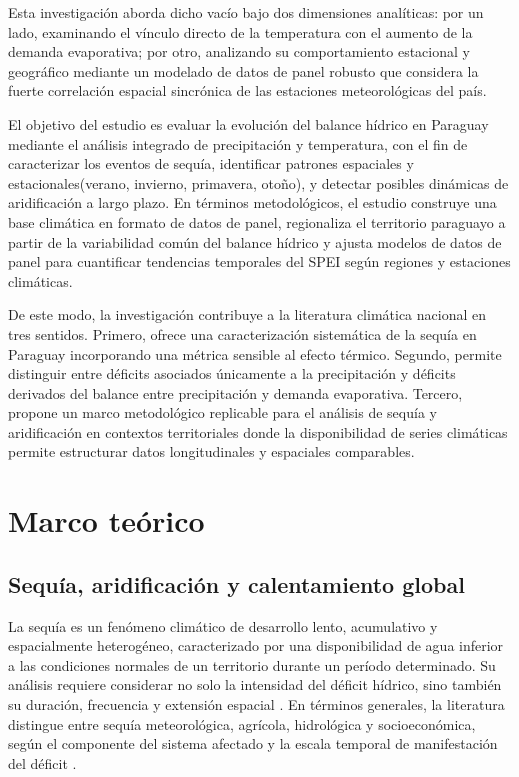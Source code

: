 \documentclass[11pt,a4paper]{article}
\begin{document}
Esta investigación aborda dicho vacío bajo dos dimensiones analíticas: por un lado, examinando el vínculo directo de la temperatura con el aumento de la demanda evaporativa; por otro, analizando su comportamiento estacional y geográfico mediante un modelado de datos de panel robusto que considera la fuerte correlación espacial sincrónica de las estaciones meteorológicas del país.

El objetivo del estudio es evaluar la evolución del balance hídrico en Paraguay mediante el análisis integrado de precipitación y temperatura, con el fin de caracterizar los eventos de sequía, identificar patrones espaciales y estacionales(verano, invierno, primavera, otoño), y detectar posibles dinámicas de aridificación a largo plazo. En términos metodológicos, el estudio construye una base climática en formato de datos de panel, regionaliza el territorio paraguayo a partir de la variabilidad común del balance hídrico y ajusta modelos de datos de panel para cuantificar tendencias temporales del SPEI según regiones y estaciones climáticas.

De este modo, la investigación contribuye a la literatura climática nacional en tres sentidos. Primero, ofrece una caracterización sistemática de la sequía en Paraguay incorporando una métrica sensible al efecto térmico. Segundo, permite distinguir entre déficits asociados únicamente a la precipitación y déficits derivados del balance entre precipitación y demanda evaporativa. Tercero, propone un marco metodológico replicable para el análisis de sequía y aridificación en contextos territoriales donde la disponibilidad de series climáticas permite estructurar datos
longitudinales y espaciales comparables.

\section{Marco teórico}

\subsection{Sequía, aridificación y calentamiento global}

La sequía es un fenómeno climático de desarrollo lento, acumulativo y espacialmente heterogéneo, caracterizado por una disponibilidad de agua inferior a las condiciones normales de un territorio durante un período determinado. Su análisis requiere considerar no solo la intensidad del déficit hídrico, sino también su duración, frecuencia y extensión espacial \citep{mishra2010,wmo2017}. En términos generales, la literatura distingue entre sequía meteorológica, agrícola, hidrológica y socioeconómica, según el componente del sistema afectado y la escala temporal de manifestación del déficit \citep{mishra2010,velasco2005sequia}.
\end{document}
